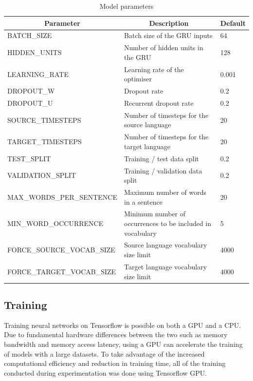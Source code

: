 

\begin{table}[!ht]
\centering
\small
\begin{tabular}{|l|p{6.6cm}|l|}
\hline
\multicolumn{1}{|c|}{\textbf{Parameter}} & \multicolumn{1}{c|}{\textbf{Description}}                                       & \textbf{Default} \\ \hline
BATCH\_SIZE                & Batch size of the \acrshort{GRU} inputs            & 64    \\ \hline
HIDDEN\_UNITS              & Number of hidden units in the \acrshort{GRU}       & 128   \\ \hline
LEARNING\_RATE             & Learning rate of the optimiser                     & 0.001 \\ \hline
DROPOUT\_W                 & Dropout rate                                       & 0.2   \\ \hline
DROPOUT\_U                 & Recurrent dropout rate                             & 0.2   \\ \hline
SOURCE\_TIMESTEPS          & Number of timesteps for the source language        & 20    \\ \hline
TARGET\_TIMESTEPS          & Number of timesteps for the target language        & 20    \\ \hline
TEST\_SPLIT                & Training / test data split                         & 0.2   \\ \hline
VALIDATION\_SPLIT          & Training / validation data split                   & 0.2   \\ \hline
MAX\_WORDS\_PER\_SENTENCE  & Maximum number of words in a sentence              & 20    \\ \hline
MIN\_WORD\_OCCURRENCE      & Minimum number of occurrences to be included in vocabulary & 5 \\ \hline
FORCE\_SOURCE\_VOCAB\_SIZE & Source language vocabulary size limit              & 4000 \\ \hline
FORCE\_TARGET\_VOCAB\_SIZE & Target language vocabulary size limit              & 4000 \\ \hline
\end{tabular}
\captionsetup{justification=centering,font=Large}
\caption{Model parameters}
\label{tab:model-parameters}
\end{table}


\subsection{Training}
Training neural networks on Tensorflow is possible on both a GPU and a CPU. Due to fundamental hardware differences between the two such as memory bandwidth and memory access latency, using a GPU can accelerate the training of models with a large datasets. To take advantage of the increased computational efficiency and reduction in training time, all of the training conducted during experimentation was done using Tensorflow GPU.

